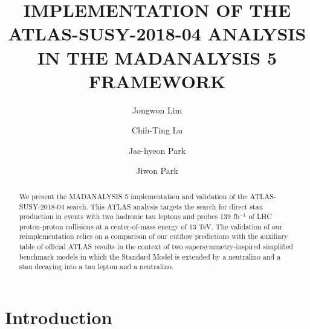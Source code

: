 \documentclass{ws-mpla}
\begin{document}

\catchline{}{}{}{}{}

\title{IMPLEMENTATION OF THE ATLAS-SUSY-2018-04 ANALYSIS IN THE MADANALYSIS 5 FRAMEWORK}

\author{\footnotesize Jongwon Lim}
\address{
  University Department, Hanyang University, Address\\
  City, State ZIP/Zone, Country}

\author{\footnotesize Chih-Ting Lu}
\address{
  School of Physics, KIAS, Seoul 130-722, Republic of Korea}

\author{\footnotesize Jae-hyeon Park}
\address{
  School of Physics, KIAS, Seoul 130-722, Republic of Korea}

\author{\footnotesize Jiwon Park}
\address{
  University Department, Hanyang University, Address\\
  City, State ZIP/Zone, Country}

\maketitle


\begin{abstract}
We present the MADANALYSIS 5 implementation and validation of the ATLAS-SUSY-2018-04 search.
This ATLAS analysis targets the search for direct stau production in events with two hadronic tau leptons and probes 139 fb$^{-1}$ of LHC proton-proton collisions at a center-of-mass energy of 13 TeV.
The validation of our reimplementation relies on a comparison of our cutflow predictions with the auxiliary table of official ATLAS results in the context of two supersymmetry-inspired simplified benchmark models in which the Standard Model is extended by a neutralino and a stau decaying into a tau lepton and a neutralino.
\end{abstract}


\section{Introduction}
\end{document}
